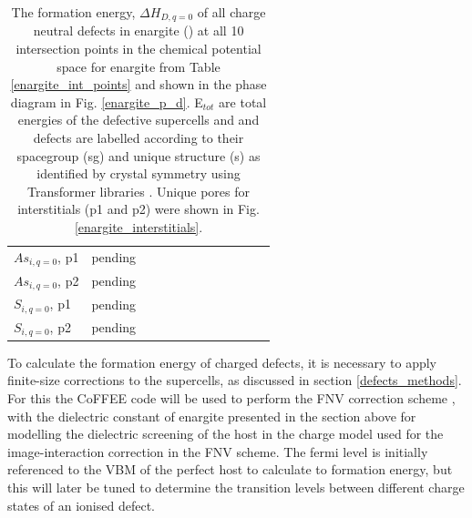 \documentclass[11pt, twoside]{report}
\begin{document}
\begin{table}[]
\begin{tabular}{@{}llllllllllll@{}}
$As_{i, q=0}$, p1    & pending                         &        &        &        &        &        &        &        &        &        &        \\
$As_{i, q=0}$, p2    & pending                         &        &        &        &        &        &        &        &        &        &        \\
$S_{i, q=0}$, p1     & pending                         &        &        &        &        &        &        &        &        &        &        \\
$S_{i, q=0}$, p2     & pending                         &        &        &        &        &        &        &        &        &        &        \\ \bottomrule
\end{tabular}
\caption[The formation energy, $\Delta H_{D, q = 0}$ of all charge neutral defects in enargite ({\enargite}) at all 10 intersection points in the chemical potential space for enargite from Table \ref{enargite_int_points} and shown in the phase diagram in Fig. \ref{enargite_p_d}. E$_{tot}$ are total energies of the defective supercells and defects are labelled according to their spacegroup (sg) and unique structure (s) as identified by crystal symmetry using Transformer libraries. Unique pores for interstitials were shown in Fig. \ref{enargite_interstitials}.]{The formation energy, $\Delta H_{D, q = 0}$ of all charge neutral defects in enargite ({\enargite}) at all 10 intersection points in the chemical potential space for enargite from Table \ref{enargite_int_points} and shown in the phase diagram in Fig. \ref{enargite_p_d}. E$_{tot}$ are total energies of the defective supercells and and defects are labelled according to their spacegroup (sg) and unique structure (s) as identified by crystal symmetry using Transformer libraries \cite{Transformer}. Unique pores for interstitials (p1 and p2) were shown in Fig. \ref{enargite_interstitials}.}\label{enargite_neutral_Ef}
\end{table}

To calculate the formation energy of charged defects, it is necessary to apply finite-size corrections to the supercells, as discussed in section \ref{defects_methods}. For this the CoFFEE code \cite{coFFEE} will be used to perform the FNV correction scheme \cite{FNV}, with the dielectric constant of enargite presented in the section above for modelling the dielectric screening of the host in the charge model used for the image-interaction correction in the FNV scheme. The fermi level is initially referenced to the VBM of the perfect host to calculate to formation energy, but this will later be tuned to determine the transition levels between different charge states of an ionised defect.\\
\end{document}

